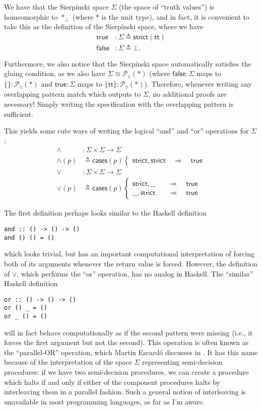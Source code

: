 \documentclass[conference]{IEEEtran}
\newcommand{\PLower}{\mathcal{P}_\lozenge}
\newcommand{\One}{\ast}
\newcommand{\Branch}{\Rightarrow}
\begin{document}
We have that the Sierp\'inski space $\Sigma$ (the space of ``truth values'') is homeomorphic to $\One_\bot$ (where $\One$ is the unit type), and in fact, it is convenient to take this as the definition of the Sierp\'inski space, where we have
\begin{align*}
\mathsf{true} &: \Sigma \triangleq \mathsf{strict}(\mathsf{tt})
\\ \mathsf{false} &: \Sigma \triangleq \bot.
\end{align*}

Furthermore, we also notice that the Sierp\'inski space automatically satisfies the gluing condition, as we also have $\Sigma \cong \PLower(\One)$ (where $\mathsf{false} : \Sigma$ maps to $\{ \} : \PLower(\One)$ and $\mathsf{true} : \Sigma$ maps to $\{ \mathsf{tt} \} : \PLower(\One)$). Therefore, whenever writing any overlapping pattern match which outputs to $\Sigma$, no additional proofs are necessary! Simply writing the specification with the overlapping pattern is sufficient.

This yields some cute ways of writing the logical ``and'' and ``or'' operations for $\Sigma$:
\begin{align*}
\wedge &: \Sigma \times \Sigma \to \Sigma
\\ \wedge(p) &\triangleq \mathsf{cases}(p)
\begin{cases}
\mathsf{strict} , \mathsf{strict}
  \quad \Branch \quad \mathsf{true}
\end{cases}
\\
\vee &: \Sigma \times \Sigma \to \Sigma
\\ \vee(p) &\triangleq \mathsf{cases}(p)
\begin{cases}
\mathsf{strict} , \_\_
  \quad &\Branch \quad \mathsf{true}
\\  \_\_ , \mathsf{strict}
  \quad &\Branch \quad \mathsf{true}
\end{cases}
\end{align*}

The first definition perhaps looks similar to the Haskell definition
\begin{verbatim}
and :: () -> () -> ()
and () () = ()
\end{verbatim}
which looks trivial, but has an important computational interpretation of forcing both of its arguments whenever the return value is forced. However, the definition of $\vee$, which performs the ``or'' operation, has no analog in Haskell. The ``similar'' Haskell definition
\begin{verbatim}
or :: () -> () -> ()
or () _ = ()
or _ () = ()
\end{verbatim}
will in fact behave computationally as if the second pattern were missing (i.e., it forces the first argument but not the second). This operation is often known as the ``parallel-OR'' operation, which Mart\'in Escard\'o discusses in \cite{escardo2004}. It has this name because of the interpretation of the space $\Sigma$ representing semi-decision procedures: if we have two semi-decision procedures, we can create a procedure which halts if and only if either of the component procedures halts by interleaving them in a parallel fashion. Such a general notion of interleaving is unavailable in most programming languages, as far as I'm aware.
\end{document}
